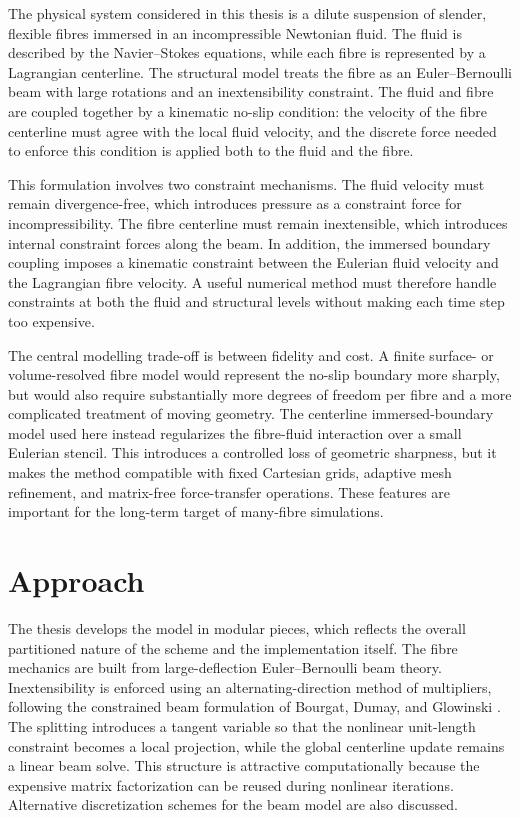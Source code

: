 The physical system considered in this thesis is a dilute suspension of
slender, flexible fibres immersed in an incompressible Newtonian fluid. The
fluid is described by the Navier--Stokes equations, while each fibre is
represented by a Lagrangian centerline. The structural model treats the fibre
as an Euler--Bernoulli beam with large rotations and an inextensibility
constraint. The fluid and fibre are coupled together by a kinematic no-slip condition: the
velocity of the fibre centerline must agree with the local fluid velocity, and
the discrete force needed to enforce this condition is applied both to the fluid and the fibre.

This formulation involves two constraint mechanisms. The fluid velocity must
remain divergence-free, which introduces pressure as a constraint force for
incompressibility. The fibre centerline must remain inextensible, which
introduces internal constraint forces along the beam. In addition, the immersed
boundary coupling imposes a kinematic constraint between the Eulerian fluid
velocity and the Lagrangian fibre velocity. A useful numerical method must
therefore handle constraints at both the fluid and structural levels without
making each time step too expensive.

The central modelling trade-off is between fidelity and cost. A finite surface- or
volume-resolved fibre model would represent the no-slip boundary more sharply,
but would also require substantially more degrees of freedom per fibre and a
more complicated treatment of moving geometry. The centerline immersed-boundary
model used here instead regularizes the fibre-fluid interaction over a small
Eulerian stencil. This introduces a controlled loss of geometric sharpness, but
it makes the method compatible with fixed Cartesian grids, adaptive mesh
refinement, and matrix-free force-transfer operations. These features are
important for the long-term target of many-fibre simulations.

\section{Approach}

The thesis develops the model in modular pieces, which reflects the overall
partitioned nature of the scheme and the implementation itself. The fibre
mechanics are built from large-deflection Euler--Bernoulli beam theory.
Inextensibility is enforced using an alternating-direction method of
multipliers, following the constrained beam formulation of Bourgat, Dumay, and
Glowinski \cite{bourgat_large_1980,glowinski_large_nodate}. The splitting
introduces a tangent variable so that the nonlinear unit-length constraint
becomes a local projection, while the global centerline update remains a linear
beam solve. This structure is attractive computationally because the expensive
matrix factorization can be reused during nonlinear iterations. Alternative
discretization schemes for the beam model are also discussed.

